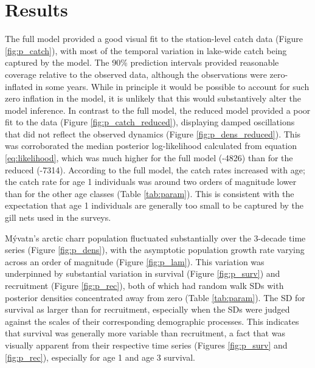 \section*{Results}

The full model provided a good visual fit to the station-level 
catch data (Figure \ref{fig:p_catch}),
with most of the temporal variation in lake-wide catch being captured by the model.
The 90\% prediction intervals provided reasonable coverage relative to the observed data,
although the observations were zero-inflated in some years.
While in principle it would be possible to account for such zero inflation in the model,
it is unlikely that this would substantively alter the model inference.
In contrast to the full model,
the reduced model provided a poor fit to the data (Figure \ref{fig:p_catch_reduced}),
displaying damped oscillations that did not reflect the observed dynamics
(Figure \ref{fig:p_dens_reduced}).
This was corroborated the median posterior log-likelihood calculated
from equation \ref{eq:likelihood},
which was much higher for the full model (-4826) than for the reduced (-7314).
According to the full model, 
the catch rates increased with age;
the catch rate for age 1 individuals was around two orders of magnitude lower
than for the other age classes (Table \ref{tab:param}). 
This is consistent with the expectation that age 1 individuals 
are generally too small to be captured by the gill nets used in the surveys.

M\'{y}vatn's arctic charr population fluctuated substantially over the 3-decade time series
(Figure \ref{fig:p_dens}), 
with the asymptotic population growth rate varying across an order of magnitude 
(Figure \ref{fig:p_lam}).
This variation was underpinned by substantial variation in survival 
(Figure \ref{fig:p_surv}) 
and recruitment (Figure \ref{fig:p_rec}),
both of which had random walk SDs 
with posterior densities concentrated away from zero (Table \ref{tab:param}).
The SD for survival as larger than for recruitment,
especially when the SDs were judged against the scales of their corresponding 
demographic processes. 
This indicates that survival was generally more variable than recruitment,
a fact that was visually apparent from their respective time series
(Figures \ref{fig:p_surv} and \ref{fig:p_rec}),
especially for age 1 and age 3 survival.

